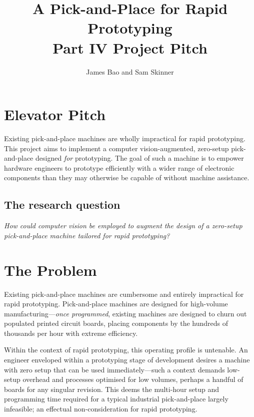 \documentclass [11pt]{article}
\title{A Pick-and-Place for Rapid Prototyping\\\medskip Part IV Project Pitch}
\author{James Bao and Sam Skinner}
\begin{document}
\maketitle

\section{Elevator Pitch}

Existing pick-and-place machines are wholly impractical for rapid prototyping.
This project aims to implement a computer vision-augmented, zero-setup pick-and-place designed \emph{for} prototyping.
The goal of such a machine is to empower hardware engineers to prototype efficiently with a wider range of electronic components than they may otherwise be capable of without machine assistance.

\subsection{The research question}

\emph{How could computer vision be employed to augment the design of a zero-setup pick-and-place machine tailored for rapid prototyping?}

\tableofcontents

\pagebreak
{}

\section{The Problem}

Existing pick-and-place machines are cumbersome and entirely impractical for rapid prototyping.
Pick-and-place machines are designed for high-volume manufacturing—\emph{once programmed}, existing machines are designed to churn out populated printed circuit boards, placing components by the hundreds of thousands per hour \cite{cite:ztar-ysm40r} with extreme efficiency.

Within the context of rapid prototyping, this operating profile is untenable.
An engineer enveloped within a prototyping stage of development desires a machine with zero setup that can be used immediately—such a context demands low-setup overhead and processes optimised for low volumes, perhaps a handful of boards for any singular revision.
This deems the multi-hour setup and programming time \cite{cite:setup-time-reduction} required for a typical industrial pick-and-place largely infeasible; an effectual non-consideration for rapid prototyping.
\end{document}
